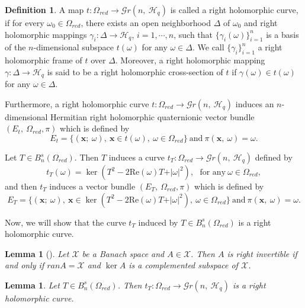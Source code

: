 \documentclass[pdflatex,sn-mathphys-num]{sn-jnl}%
\theoremstyle{thmstyleone}%
\theoremstyle{thmstyletwo}%
\theoremstyle{thmstylethree}%
\newtheorem{definition}{Definition}%
\newtheorem{lemma}{Lemma}%
\newtheorem{lemma}[theorem]{Lemma}
\theoremstyle{definition}
\newtheorem{definition}[theorem]{Definition}
\theoremstyle{remark}
\begin{document}
\begin{definition}
	A map $t:\Omega_{red}\rightarrow\mathcal{G}r(n,\ \mathcal{H}_q)$ is called a right holomorphic curve, if for every $\omega_0\in\Omega_{red}$, there exists an open neighborhood $\Delta$ of $\omega_0$ and   right holomorphic mappings $\gamma_i:\Delta\rightarrow\mathcal{H}_q$, $i=1, \cdots, n$, such that
    $\{\gamma_i(\omega)\}_{i=1}^n$ is a basis of the $n$-dimensional subspace $t(\omega)$ for any $\omega\in\Delta$. We call $\{\gamma_i\}_{i=1}^n$ a right holomorphic frame of $t$ over $\Delta$. Moreover, a right holomorphic mapping $\gamma:\Delta\rightarrow\mathcal{H}_q$ is said to be a right holomorphic cross-section of $t$ if $\gamma(\omega)\in t(\omega)$ for any $\omega\in\Delta$.

    Furthermore, a right holomorphic curve $t:\Omega_{red}\rightarrow\mathcal{G}r(n,\ \mathcal{H}_q)$ induces an $n$-dimensional Hermitian right holomorphic quaternionic vector bundle $(E_t,\ \Omega_{red},\pi)$ which is  defined by
    \[
    E_t=\{(\boldsymbol{x};\ \omega),\ \boldsymbol{x}\in t(\omega),\ \omega\in\Omega_{red}\}\ \mathrm{and}\ \pi(\boldsymbol{x},\ \omega)=\omega.
    \]
    \end{definition}

    Let  $T\in B_n^{s}(\Omega_{red})$. Then $T$ induces a curve $t_T:\Omega_{red}\rightarrow\mathcal{G}r(n,\ \mathcal{H}_q)$ defined by
\[
t_T(\omega)=\ker(T^2-2\mathrm{Re}(\omega)T+\vert\omega\vert^2),\ \ \ \text{for any} \ \omega\in\Omega_{red},
\]
and then $t_T$ induces a vector bundle $(E_T,\ \Omega_{red},\pi)$  which is defined by
  \[
E_T=\{(\boldsymbol{x};\ \omega),\ \boldsymbol{x}\in \ker(T^2-2\mathrm{Re}(\omega)T+\vert\omega\vert^2),\ \omega\in\Omega_{red}\}\ \mathrm{and}\ \pi(\boldsymbol{x},\ \omega)=\omega.
\]

Now, we will show that the curve $t_T$ induced by $T\in B_n^{s}(\Omega_{red})$ is a right holomorphic curve.


\begin{lemma}[\cite{CO}]\label{CO}
	Let $\mathcal{X}$ be a Banach space and $A\in\mathcal{X}$. Then $A$ is right invertible if and only if $ran A = \mathcal{X}$ and $\ker A$ is a complemented subspace of $\mathcal{X}$.
	\end{lemma}
	
	\begin{lemma}\label{RI}
	Let $T\in B_n^{s}(\Omega_{red})$. Then $t_T:\Omega_{red}\rightarrow\mathcal{G}r(n,\ \mathcal{H}_q)$ is a right holomorphic curve.
	\end{lemma}\label{RH}
\end{document}
